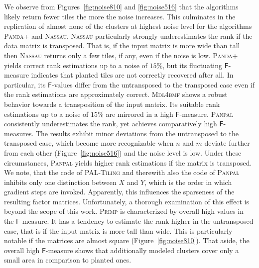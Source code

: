 We observe from Figures~\ref{fig:noise810} and \ref{fig:noise516} that the algorithms likely return fewer tiles the more the noise increases. This culminates in the replication of almost none of the clusters at highest noise level for the algorithms \textsc{Panda+} and \textsc{Nassau}. \textsc{Nassau} particularly strongly underestimates the rank if the data matrix is transposed. That is, if the input matrix is more wide than tall then \textsc{Nassau} returns only a few tiles, if any, even if the noise is low. \textsc{Panda+} yields correct rank estimations up to a noise of $15\%$, but its fluctuating $\mathsf{F}$-measure indicates that planted tiles are not correctly recovered after all. In particular, its $\mathsf{F}$-values  differ from the untransposed to the transposed case even if the rank estimations are approximately correct. \textsc{Mdl4bmf} shows a robust behavior towards a transposition of the input matrix. Its suitable rank estimations up to a noise of $15\%$ are mirrored in a high $\mathsf{F}$-measure. \textsc{Panpal} consistently underestimates the rank, yet achieves comparatively high $\mathsf{F}$-measures. The results exhibit minor deviations from the untransposed to the transposed case, which become more recognizable when $n$ and $m$ deviate further from each other (Figure~\ref{fig:noise516}) and the noise level is low. Under these circumstances, \textsc{Panpal} yields  higher rank estimations if the matrix is transposed. We note, that  the code of \textsc{PAL-Tiling} and therewith also the code of \textsc{Panpal} inhibits only one distinction between  $X$ and $Y$, which is the order in which gradient steps are invoked. Apparently, this influences the sparseness of the resulting factor matrices. Unfortunately, a thorough examination of this effect is beyond the scope of this work.  
\textsc{Primp} is characterized by overall high values in the $\mathsf{F}$-measure. It has a tendency to estimate the rank higher in the untransposed case, that is if the input matrix is more tall than wide. This is particularly notable if the  matrices are almost square (Figure~\ref{fig:noise810}). That aside, the overall high $\mathsf{F}$-measure shows that additionally modeled clusters cover only a small area in comparison to planted ones. 

